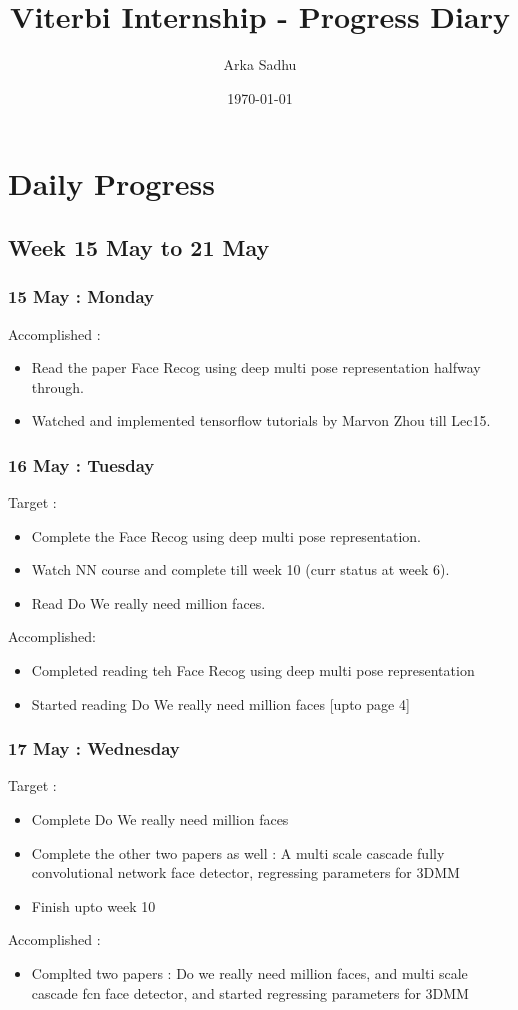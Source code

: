 \documentclass{article}
\title{Viterbi Internship - Progress Diary}
\author{
  Arka Sadhu}
\date{\today}
\begin{document}
\maketitle

\tableofcontents
\newpage
\section{Daily Progress}
\subsection{Week 15 May to 21 May}
\subsubsection{15 May : Monday}
Accomplished :
\begin{itemize}
\item Read the paper Face Recog using deep multi pose representation halfway through.
\item Watched and implemented tensorflow tutorials by Marvon Zhou till Lec15.
\end{itemize}

\subsubsection{16 May : Tuesday}
Target :
\begin{itemize}
\item Complete the Face Recog using deep multi pose representation.
\item Watch NN course  and complete till week 10 (curr status at week 6).
\item Read Do We really need million faces.
\end{itemize}
Accomplished:
\begin{itemize}
\item Completed reading teh Face Recog using deep multi pose representation
\item Started reading Do We really need million faces [upto page 4]
\end{itemize}

\subsubsection{17 May : Wednesday}
Target :
\begin{itemize}
\item Complete Do We really need million faces
\item Complete the other two papers as well : A multi scale cascade fully convolutional network face detector, regressing parameters for 3DMM
\item Finish upto week 10
\end{itemize}
Accomplished :
\begin{itemize}
\item Complted two papers : Do we really need million faces, and multi scale cascade fcn face detector, and started regressing parameters for 3DMM
\end{itemize}
\end{document}
